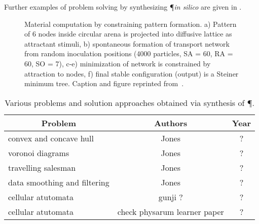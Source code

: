 			Further examples of problem solving by synthesizing \P \textit{in silico} are given in .

			\begin{figure}
				\centering
				\newline
				
				
				\caption[Multi-agent \P - Evolution of agents]{Material computation by constraining pattern formation. a) Pattern of 6 nodes inside circular arena is projected into diffusive lattice as attractant stimuli, b) spontaneous formation of transport network from random inoculation positions (4000 particles, SA = 60, RA = 60, SO = 7), c-e) minimization of network is constrained by attraction to nodes, f) final stable configuration (output) is a Steiner minimum tree. Caption and figure reprinted from~\cite{jones2016multi}.}
				\label{fig:agent_mst}
			\end{figure}

			\begin{table}
				\centering
				\begin{tabular}{@{} l *2c @{}}
				\toprule
				 \multicolumn{1}{c}{Problem}    & Authors  & Year   \\ 
				\midrule
				 convex and concave hull & Jones & ? \\ 
				 voronoi diagrams & Jones & ? \\ 
				 travelling salesman & Jones & ? \\ 
				 data smoothing and filtering & Jones & ? \\ 
				 cellular atutomata & gunji ? & ? \\ 
				 cellular atutomata & check physarum learner paper  & ? \\ 


				\bottomrule
				\end{tabular}
				\caption[Computing by synthesis of \P]{Various problems and solution approaches obtained via synthesis of \P.}
				\label{tab:list_synthesize}
			\end{table}



